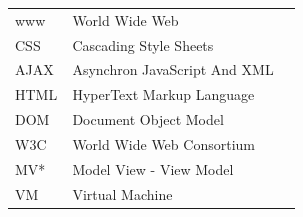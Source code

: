 \documentclass[a4paper,bibtotoc,oneside]{scrbook}
\begin{document}








\listoffigures
{} %
\newpage


\hspace{-17mm}\begin{tabular}{>{\raggedleft}p{0.2\linewidth} p{0.75\linewidth} p{0.1\linewidth}}

www & World Wide Web\\
CSS & Cascading Style Sheets\\
AJAX & Asynchron JavaScript And XML\\
HTML & HyperText Markup Language\\
DOM & Document Object Model\\
W3C & World Wide Web Consortium\\
MV* & Model View - View Model\\
VM & Virtual Machine\\

\end{tabular}


\end{document}
